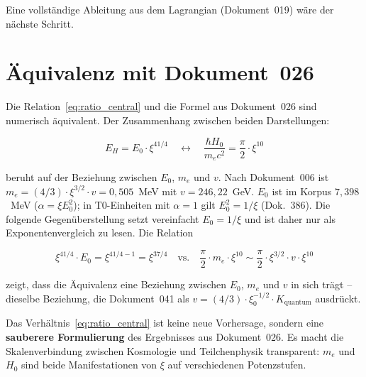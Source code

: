 Eine vollständige Ableitung aus dem Lagrangian (Dokument~019) wäre der
nächste Schritt.

\section{Äquivalenz mit Dokument~026}
\label{sec:aequivalenz}

Die Relation~\eqref{eq:ratio_central} und die Formel aus Dokument~026
sind numerisch äquivalent. Der Zusammenhang zwischen beiden Darstellungen:

\begin{equation}
    E_H = E_0 \cdot \xi^{41/4}
    \quad \longleftrightarrow \quad
    \frac{\hbar H_0}{m_e c^2} = \frac{\pi}{2} \cdot \xi^{10}
\end{equation}

beruht auf der Beziehung zwischen $E_0$, $m_e$ und $v$. Nach Dokument~006 ist
$m_e = (4/3) \cdot \xi^{3/2} \cdot v = 0{,}505$~MeV mit $v = 246{,}22$~GeV. $E_0$ ist im
Korpus $7{,}398$~MeV ($\alpha = \xi E_0^2$); in T0-Einheiten mit $\alpha = 1$ gilt
$E_0^2 = 1/\xi$ (Dok.~386). Die folgende Gegenüberstellung setzt vereinfacht
$E_0 = 1/\xi$ und ist daher nur als Exponentenvergleich zu lesen. Die Relation

\begin{equation}
    \xi^{41/4} \cdot E_0 = \xi^{41/4 - 1} = \xi^{37/4}
    \quad \text{vs.} \quad
    \frac{\pi}{2} \cdot m_e \cdot \xi^{10} \sim \frac{\pi}{2} \cdot \xi^{3/2} \cdot v \cdot \xi^{10}
\end{equation}

zeigt, dass die Äquivalenz eine Beziehung zwischen $E_0$, $m_e$ und $v$
in sich trägt -- dieselbe Beziehung, die Dokument~041 als
$v = (4/3) \cdot \xi_0^{-1/2} \cdot K_\text{quantum}$ ausdrückt.

\begin{interpretation}
    Das Verhältnis~\eqref{eq:ratio_central} ist keine neue Vorhersage,
    sondern eine \textbf{sauberere Formulierung} des Ergebnisses aus
    Dokument~026. Es macht die Skalenverbindung zwischen Kosmologie
    und Teilchenphysik transparent: $m_e$ und $H_0$ sind beide
    Manifestationen von $\xi$ auf verschiedenen Potenzstufen.
\end{interpretation}

